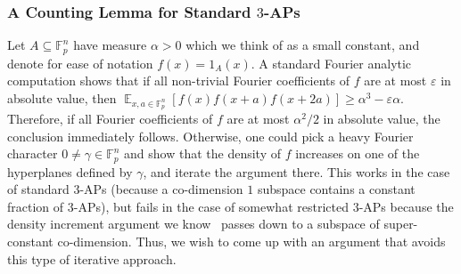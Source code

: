 \documentclass[11pt]{article}
\newcommand\Expect[2]{{\mathop{\mathbb{E}}_{#1}\left[ {#2} \right]}}
\newcommand\eps{\varepsilon}
\renewcommand\geq{\geqslant}
\begin{document}
\subsubsection{A Counting Lemma for Standard \texorpdfstring{$3$}{3}-APs}
Let $A\subseteq \mathbb{F}_p^n$ have measure $\alpha>0$ which we think of as a small constant, and denote for ease of notation $f(x) = 1_A(x)$. 
A standard Fourier analytic computation shows that if all non-trivial Fourier coefficients of $f$ are at most $\eps$ in absolute value, then 
$\Expect{x,a\in\mathbb{F}_p^{n}}{f(x)f(x+a)f(x+2a)}\geq \alpha^3 - \eps\alpha$. 
Therefore, if all Fourier coefficients of $f$ are at most $\alpha^2/2$ in absolute value, the conclusion immediately follows. Otherwise, one could pick a heavy Fourier character $0\neq \gamma\in\mathbb{F}_p^n$ and show that the density of $f$ increases on one of the hyperplanes defined by $\gamma$, and iterate the argument there. This works in the case of standard $3$-APs (because a co-dimension $1$ subspace contains a constant fraction of $3$-APs), but fails in the case of somewhat restricted $3$-APs because the density increment argument we know~\cite{BKM3AP} passes down to a subspace of super-constant co-dimension. Thus, we wish to come up with an argument that avoids this type of iterative approach.
\end{document}
